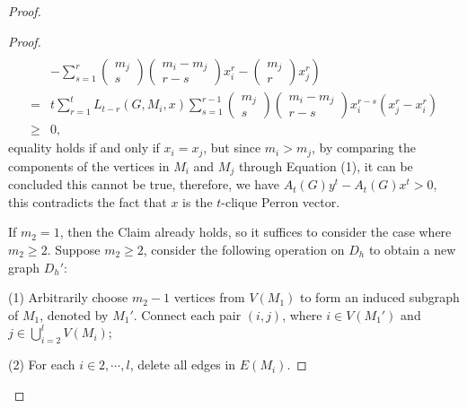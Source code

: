 \documentclass[preprint,12pt]{elsarticle}
\begin{document}
\begin{proof}
\begin{proof}
\begin{align*}
                        \\& \left.- \sum_{s=1}^r \begin{pmatrix} m_j\\s \end{pmatrix} \begin{pmatrix}m_i-m_j\\ r-s \end{pmatrix} x_i^{r} - \begin{pmatrix}m_j\\r\end{pmatrix} x_j^r \right)
                        \\= &t\sum_{r=1}^t L_{t-r}(G, M_i, x) \sum_{s=1}^{r-1} \begin{pmatrix} m_j\\s \end{pmatrix} \begin{pmatrix}m_i-m_j\\ r-s \end{pmatrix} x_i^{r-s}(x_j^{r}-x_i^{r})
                        \\\geq &0,
                    \end{align*}
                equality holds if and only if $x_i=x_j$, but since $m_i > m_j$, by comparing the components of the vertices in $M_i $ and $M_j $ through Equation (1), it can be concluded this cannot be true, therefore, we have $A_t(G)y^t-A_t(G)x^t > 0$, this contradicts the fact that $x$ is the $t$-clique Perron vector.

                If $m_2 = 1$, then the Claim already holds, so it suffices to consider the case where $m_2 \geq 2$. Suppose $m_2 \geq 2$, consider the following operation on $D_h$ to obtain a new graph $D_h'$:

                \noindent (1) Arbitrarily choose $m_2 - 1$ vertices from $V(M_1)$ to form an induced subgraph of $M_1$, denoted by $M_1'$. Connect each pair $(i, j)$, where $i \in V(M_1')$ and $j \in \bigcup_{i=2}^l V(M_i)$;

                \noindent (2) For each $i \in {2, \cdots, l}$, delete all edges in $E(M_i)$.


\end{proof}
\end{proof}
\end{document}
